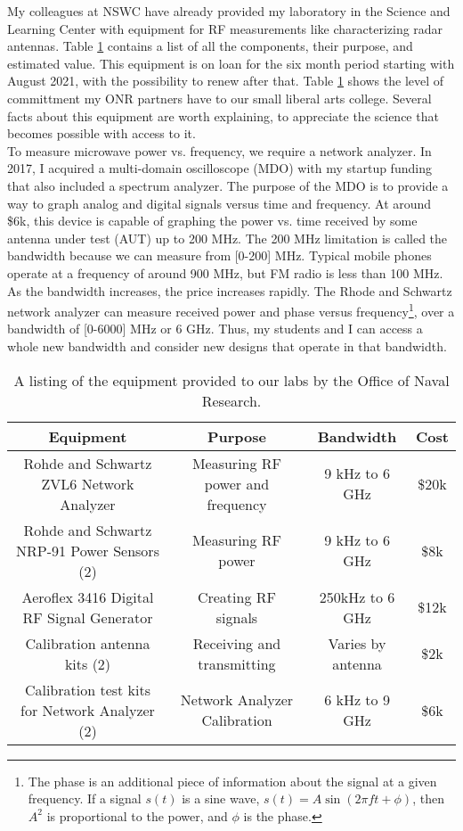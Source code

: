 \documentclass[../../../main.tex]{subfiles}
\begin{document}
My colleagues at NSWC have already provided my laboratory in the Science and Learning Center with equipment for RF measurements like characterizing radar antennas.  Table \ref{tab:equip} contains a list of all the components, their purpose, and estimated value.  This equipment is on loan for the six month period starting with August 2021, with the possibility to renew after that.  Table \ref{tab:equip} shows the level of committment my ONR partners have to our small liberal arts college.  Several facts about this equipment are worth explaining, to appreciate the science that becomes possible with access to it.
\\
\vspace{0.25cm}
To measure microwave power vs. frequency, we require a network analyzer.  In 2017, I acquired a multi-domain oscilloscope (MDO) with my startup funding that also included a spectrum analyzer.  The purpose of the MDO is to provide a way to graph analog and digital signals versus time and frequency.  At around \$6k, this device is capable of graphing the power vs. time received by some antenna under test (AUT) up to 200 MHz.  The 200 MHz limitation is called the bandwidth because we can measure from [0-200] MHz.  Typical mobile phones operate at a frequency of around 900 MHz, but FM radio is less than 100 MHz.  As the bandwidth increases, the price increases rapidly.  The Rhode and Schwartz network analyzer can measure received power and phase versus frequency\footnote{The phase is an additional piece of information about the signal at a given frequency.  If a signal $s(t)$ is a sine wave, $s(t) = A\sin(2\pi f t + \phi)$, then $A^2$ is proportional to the power, and $\phi$ is the phase.}, over a bandwidth of [0-6000] MHz or 6 GHz.  Thus, my students and I can access a whole new bandwidth and consider new designs that operate in that bandwidth.
\\
\vspace{0.25cm}

\begin{table}
\centering
\begin{tabular}{c c c c}
Equipment & Purpose & Bandwidth & Cost \\ \hline
Rohde and Schwartz ZVL6 Network Analyzer & Measuring RF power and frequency & 9 kHz to 6 GHz & \$20k \\
Rohde and Schwartz NRP-91 Power Sensors (2) & Measuring RF power & 9 kHz to 6 GHz & \$8k \\
Aeroflex 3416 Digital RF Signal Generator & Creating RF signals & 250kHz to 6 GHz & \$12k \\
Calibration antenna kits (2) & Receiving and transmitting & Varies by antenna & \$2k \\
Calibration test kits for Network Analyzer (2) & Network Analyzer Calibration & 6 kHz to 9 GHz & \$6k
\end{tabular}
\caption{\label{tab:equip} A listing of the equipment provided to our labs by the Office of Naval Research.}
\end{table}
\end{document}
